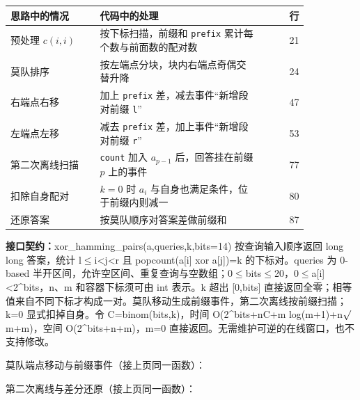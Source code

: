 \begin{center}\small
\begin{tabular}{@{}p{0.30\linewidth}p{0.55\linewidth}r@{}}
\toprule
思路中的情况 & 代码中的处理 & 行\\
\midrule
预处理 $c(i,i)$ & 按下标扫描，前缀和 \texttt{prefix} 累计每个数与前面数的配对数 & 21\\
莫队排序 & 按左端点分块，块内右端点奇偶交替升降 & 24\\
右端点右移 & 加上 \texttt{prefix} 差，减去事件“新增段对前缀 \texttt{l}” & 47\\
左端点左移 & 减去 \texttt{prefix} 差，加上事件“新增段对前缀 \texttt{r}” & 53\\
第二次离线扫描 & \texttt{count} 加入 $a_{p-1}$ 后，回答挂在前缀 $p$ 上的事件 & 77\\
扣除自身配对 & $k=0$ 时 $a_i$ 与自身也满足条件，位于前缀内则减一 & 80\\
还原答案 & 按莫队顺序对答案差做前缀和 & 87\\
\bottomrule
\end{tabular}
\end{center}



{\sloppy{}\noindent\textbf{接口契约：}xor\_hamming\_pairs(a,queries,k,bits=14) 按查询输入顺序返回 long long 答案，统计 l$\le$i<j<r 且 popcount(a[i] xor a[j])=k 的下标对。queries 为 0-based 半开区间，允许空区间、重复查询与空数组；0$\le$bits$\le$20，0$\le$a[i]<2\textasciicircum{}bits，n、m 和容器下标须可由 int 表示。k 超出 [0,bits] 直接返回全零；相等值来自不同下标才构成一对。莫队移动生成前缀事件，第二次离线按前缀扫描；k=0 显式扣掉自身。令 C=binom(bits,k)，时间 O(2\textasciicircum{}bits+nC+m log(m+1)+n$\sqrt{\vphantom x}$m+m)，空间 O(2\textasciicircum{}bits+n+m)，m=0 直接返回。无需维护可逆的在线窗口，也不支持修改。\par}

\Needspace{585pt}



\newpage

\noindent 莫队端点移动与前缀事件（接上页同一函数）：



\newpage

\noindent 第二次离线与差分还原（接上页同一函数）：



